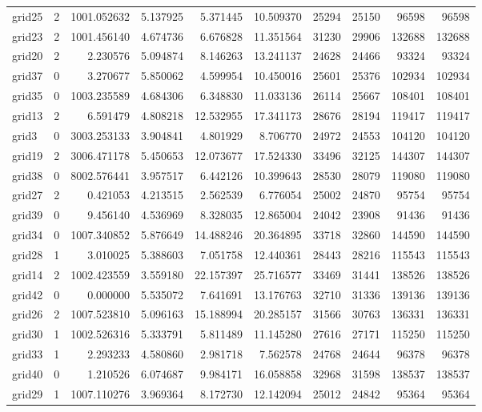 \begin{longtable}{|l|r|r|r|r|r|r|r|r|r|}
grid25 & 2 & 1001.052632 & 5.137925 & 5.371445 & 10.509370 & 25294 & 25150 & 96598 & 96598 \\
grid23 & 2 & 1001.456140 & 4.674736 & 6.676828 & 11.351564 & 31230 & 29906 & 132688 & 132688 \\
grid20 & 2 & 2.230576 & 5.094874 & 8.146263 & 13.241137 & 24628 & 24466 & 93324 & 93324 \\
grid37 & 0 & 3.270677 & 5.850062 & 4.599954 & 10.450016 & 25601 & 25376 & 102934 & 102934 \\
grid35 & 0 & 1003.235589 & 4.684306 & 6.348830 & 11.033136 & 26114 & 25667 & 108401 & 108401 \\
grid13 & 2 & 6.591479 & 4.808218 & 12.532955 & 17.341173 & 28676 & 28194 & 119417 & 119417 \\
grid3 & 0 & 3003.253133 & 3.904841 & 4.801929 & 8.706770 & 24972 & 24553 & 104120 & 104120 \\
grid19 & 2 & 3006.471178 & 5.450653 & 12.073677 & 17.524330 & 33496 & 32125 & 144307 & 144307 \\
grid38 & 0 & 8002.576441 & 3.957517 & 6.442126 & 10.399643 & 28530 & 28079 & 119080 & 119080 \\
grid27 & 2 & 0.421053 & 4.213515 & 2.562539 & 6.776054 & 25002 & 24870 & 95754 & 95754 \\
grid39 & 0 & 9.456140 & 4.536969 & 8.328035 & 12.865004 & 24042 & 23908 & 91436 & 91436 \\
grid34 & 0 & 1007.340852 & 5.876649 & 14.488246 & 20.364895 & 33718 & 32860 & 144590 & 144590 \\
grid28 & 1 & 3.010025 & 5.388603 & 7.051758 & 12.440361 & 28443 & 28216 & 115543 & 115543 \\
grid14 & 2 & 1002.423559 & 3.559180 & 22.157397 & 25.716577 & 33469 & 31441 & 138526 & 138526 \\
grid42 & 0 & 0.000000 & 5.535072 & 7.641691 & 13.176763 & 32710 & 31336 & 139136 & 139136 \\
grid26 & 2 & 1007.523810 & 5.096163 & 15.188994 & 20.285157 & 31566 & 30763 & 136331 & 136331 \\
grid30 & 1 & 1002.526316 & 5.333791 & 5.811489 & 11.145280 & 27616 & 27171 & 115250 & 115250 \\
grid33 & 1 & 2.293233 & 4.580860 & 2.981718 & 7.562578 & 24768 & 24644 & 96378 & 96378 \\
grid40 & 0 & 1.210526 & 6.074687 & 9.984171 & 16.058858 & 32968 & 31598 & 138537 & 138537 \\
grid29 & 1 & 1007.110276 & 3.969364 & 8.172730 & 12.142094 & 25012 & 24842 & 95364 & 95364 \\

\end{longtable}

